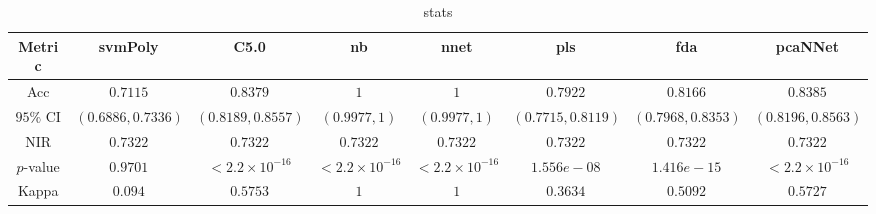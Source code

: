 \begin{table}[!ht]
	\centering
	\begin{tabular}{|c|c|c|c|c|c|c|c|}
		\hline
		Metric & svmPoly & C5.0 & nb & nnet & pls & fda & pcaNNet \\ \hline
		Acc & $0.7115$ & $0.8379$ & $1$ & $1$ & $0.7922$ & $0.8166$ & $0.8385$ \\ \hline
		$95\%$ CI & $(0.6886, 0.7336)$ & $(0.8189, 0.8557)$ & $(0.9977, 1)$ & $(0.9977, 1)$ & $(0.7715, 0.8119)$ & $(0.7968, 0.8353)$ & $(0.8196, 0.8563)$ \\ \hline
		NIR & $0.7322$ & $0.7322$ & $0.7322$ & $0.7322$ & $0.7322$ & $0.7322$ & $0.7322$ \\ \hline
		$p$-value & $0.9701$ & $< 2.2 \times {10}^{-16}$ & $< 2.2 \times {10}^{-16}$ & $< 2.2 \times {10}^{-16}$ & $1.556e-08$ & $1.416e-15$ & $< 2.2 \times {10}^{-16}$ \\ \hline
		Kappa & $0.094$ & $0.5753$ & $1$ & $1$ & $0.3634$ & $0.5092$ & $0.5727$ \\ \hline
	\end{tabular}
	\caption{stats}
	\label{tab:stats}
\end{table}

